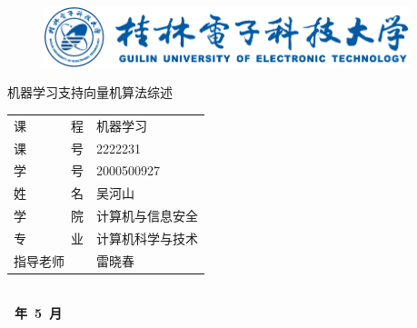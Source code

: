 
\begin{titlepage}
	\begin{center}
	\begin{figure}[!ht]\vspace{2em}
		\centering
		\includegraphics[width=0.95\textwidth]{figures/桂电标志.pdf}
		\vspace{3em}\\
	\end{figure}
		
		\vspace{1.5em}
		
		\vspace{5em}
		\begin{center} {\erhao\hei 机器学习支持向量机算法综述}\end{center}
		
		\vspace{1em}
		{\sanhao
			\begin{center} \renewcommand{\arraystretch}{1.7}
				\begin{tabular}{l@{：}l}
					
					课~~~~~~~程 & 机器学习\\
					课~~~~~~~号 & 2222231\\
					学~~~~~~~号 & 2000500927 \\
					姓~~~~~~~名 & 吴河山 \\
                    学~~~~~~~院 & 计算机与信息安全\\
                    专~~~~~~~业 & 计算机科学与技术\\
					  指导老师  &  雷晓春\\
					
				\end{tabular} \renewcommand{\arraystretch}{1}\\
				\vspace{8em}
				\textbf{~年~5~月} \\
			\end{center} 
		}
	\end{center}
	

\end{titlepage}
